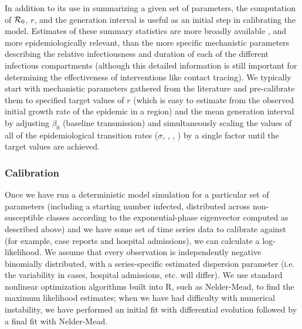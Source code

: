 \documentclass[12pt]{article}\usepackage[]{graphicx}\usepackage[]{color}
\begin{document}




In addition to its use in summarizing a given set of parameters, the computation of ${\mathcal R}_0$, $r$, and the generation interval is useful as an initial step in calibrating the model. 
Estimates of these summary statistics are more broadly available \cite{park2020reconciling}, and more epidemiologically relevant, than the more specific mechanistic parameters describing the relative infectiousness and duration of each of the different infectious compartments (although this detailed information is still important for determining the effectiveness of interventions like contact tracing). 
We typically start with mechanistic parameters gathered from the literature and pre-calibrate them to specified target values of $r$ (which is easy to estimate from the observed initial growth rate of the epidemic in a region) and the mean generation interval by adjusting $\beta_0$ (baseline transmission) and simultaneously scaling the values of all of the epidemiological transition rates ($\sigma$, , , ) by a single factor until the target values are achieved.

\subsubsection*{Calibration}

Once we have run a deterministic model simulation for a particular set of parameters (including a starting number infected, distributed across non-susceptible classes according to the exponential-phase eigenvector computed as described above) and we have some set of time series data to calibrate against (for example, case reports and hospital admissions), we can calculate a log-likelihood. 
We assume that every observation is independently negative binomially distributed, with a series-specific estimated dispersion parameter (i.e. the variability in cases, hospital admissions, etc. will differ). 
We use standard nonlinear optimization algorithms built into R, such as Nelder-Mead, to find the maximum likelihood estimates; when we have had difficulty with numerical instability, we have performed an initial fit with differential evolution \cite{Mull+11} followed by a final fit with Nelder-Mead.
\end{document}
